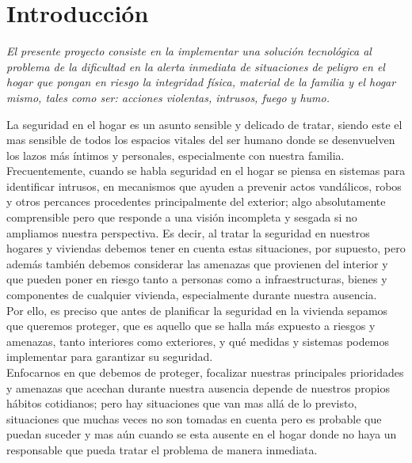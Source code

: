 \chapter{Introducción}

\begin{center}
    \textit{
        El presente proyecto consiste en la implementar una solución tecnológica al problema de la dificultad en la alerta inmediata de situaciones de peligro en el hogar que pongan en riesgo la integridad física, material de la familia y el hogar mismo, tales como ser: acciones violentas, intrusos, fuego y humo.
    }
\end{center}

La seguridad en el hogar es un asunto sensible y delicado de tratar, siendo este el mas sensible de todos los espacios vitales del ser humano donde se desenvuelven los lazos más íntimos y personales, especialmente con nuestra familia.\\

Frecuentemente, cuando se habla seguridad en el hogar se piensa en sistemas para identificar intrusos, en mecanismos que ayuden a prevenir actos vandálicos, robos y otros percances procedentes principalmente del exterior; algo absolutamente comprensible pero que responde a una visión incompleta y sesgada si no ampliamos nuestra perspectiva. Es decir, al tratar la seguridad en nuestros hogares y viviendas debemos tener en cuenta estas situaciones, por supuesto, pero además también debemos considerar las amenazas que provienen del interior y que pueden poner en riesgo tanto a personas como a infraestructuras, bienes y componentes de cualquier vivienda, especialmente durante nuestra ausencia.\\

Por ello, es preciso que antes de planificar la seguridad en la vivienda sepamos que queremos proteger, que es aquello que se halla más expuesto a riesgos y amenazas, tanto interiores como exteriores, y qué medidas y sistemas podemos implementar para garantizar su seguridad. \\

Enfocarnos en que debemos de proteger, focalizar nuestras principales prioridades y amenazas que acechan durante nuestra ausencia depende de nuestros propios hábitos cotidianos; pero hay situaciones que van mas allá de lo previsto, situaciones que muchas veces no son tomadas en cuenta pero es probable que puedan suceder y mas aún cuando se esta ausente en el hogar donde no haya un responsable que pueda tratar el problema de manera inmediata.\\

